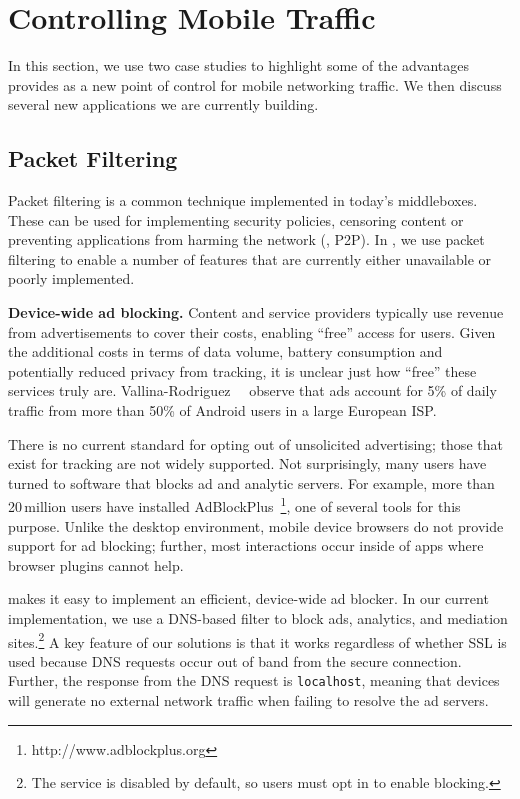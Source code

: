 \section{Controlling Mobile Traffic}
In this section, we use two case studies to highlight some of the 
advantages \meddle provides as a new point of control 
for mobile networking traffic. We then discuss several new applications 
we are currently building.

\subsection{Packet Filtering}
Packet filtering is a common technique implemented in 
today's middleboxes. These can be used for implementing 
security policies, censoring content or preventing applications 
from harming the network (\eg, P2P). In \meddle, we use 
packet filtering to enable a number of features that are 
currently either unavailable or poorly implemented.

\noindent\textbf{Device-wide ad blocking.} Content and service providers 
typically use revenue from advertisements to cover their costs, enabling 
``free'' access for users. Given the additional costs in terms of data volume, 
battery consumption and potentially reduced privacy from tracking, it is unclear 
just how ``free'' these services truly are. Vallina-Rodriguez~\etal~\cite{Vallina-rodriguez:2012:AdCache} observe
that ads account for 5\% of daily traffic from more than 50\% of
Android users in a large European ISP. 

There is no current standard for opting 
out of unsolicited advertising; those that exist for tracking are not widely supported. 
Not surprisingly, many users have turned to software that blocks ad and analytic servers. 
For example, more than 20\,million users have installed 
AdBlockPlus~\footnote{http://www.adblockplus.org}, one of several tools for this purpose. 
Unlike the desktop environment, mobile device browsers do not provide support for 
ad blocking; further, most interactions occur inside of apps where browser plugins 
cannot help. 

\meddle makes it easy to implement an efficient, device-wide ad blocker. 
In our current implementation, we use a DNS-based filter to
block ads, analytics, and mediation sites.\footnote{The service is disabled by default, so users must 
opt in to enable blocking.} A key feature of our solutions is that it works 
regardless of whether SSL is used because DNS requests occur out of band 
from the secure connection. Further, the response from the DNS request is {\tt localhost}, 
meaning that devices will generate no external network traffic when failing 
to resolve the ad servers. 

